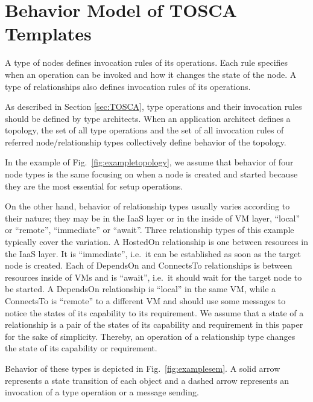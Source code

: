 \documentclass[12pt]{report}
\begin{document}
\section{Behavior Model of TOSCA Templates}
\label{sec:TOSCAbehavior}
A type of nodes defines invocation rules of its operations. Each rule
specifies when an operation can be invoked and how it changes the
state of the node.  A type of relationships also defines invocation
rules of its operations. 

As described in Section \ref{sec:TOSCA}, type operations and their
invocation rules should be defined by type architects. When an
application architect defines a topology, the set of all type
operations and the set of all invocation rules of referred
node/relationship types collectively define behavior of the topology.

In the example of Fig.~\ref{fig:exampletopology}, we assume that
behavior of four node types is the same focusing on when a node is
created and started because they are the most essential for setup
operations.

On the other hand, behavior of relationship types usually varies
according to their nature; they may be in the IaaS layer or in the
inside of VM layer, ``local'' or ``remote'', ``immediate'' or
``await''. Three relationship types of this example typically cover
the variation. A HostedOn relationship is one between resources in the
IaaS layer.  It is ``immediate'', i.e.\ it can be established as soon
as the target node is created.  Each of DependsOn and ConnectsTo
relationships is between resources inside of VMs and is ``await'',
i.e.\ it should wait for the target node to be started. A DependsOn
relationship is ``local'' in the same VM, while a ConnectsTo is
``remote'' to a different VM and should use some messages to notice
the states of its capability to its requirement. We assume that a
state of a relationship is a pair of the states of its capability and
requirement in this paper for the sake of simplicity. Thereby, an
operation of a relationship type changes the state of its capability
or requirement.

Behavior of these types is depicted in Fig.~\ref{fig:examplesem}.  A
solid arrow represents a state transition of each object and a dashed
arrow represents an invocation of a type operation or a message
sending.
\end{document}
